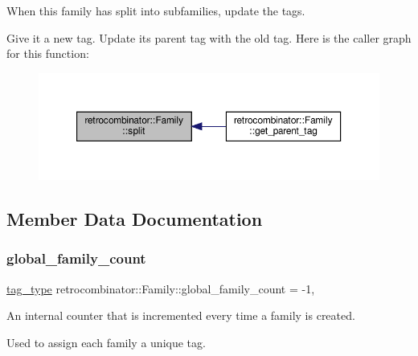 When this family has split into subfamilies, update the tags. 

Give it a new tag. Update its parent tag with the old tag. Here is the caller graph for this function\+:
\nopagebreak
\begin{figure}[H]
\begin{center}
\leavevmode
\includegraphics[width=350pt]{classretrocombinator_1_1Family_a721e453eb40fa49bd38ae24df001f9a3_icgraph}
\end{center}
\end{figure}


\subsection{Member Data Documentation}
\mbox{\label{classretrocombinator_1_1Family_a957b56c44378b30bfeb0a8eebe9aa32d}} 
\subsubsection{\texorpdfstring{global\+\_\+family\+\_\+count}{global\_family\_count}}
{\footnotesize\ttfamily \hyperlink{namespaceretrocombinator_afd7c6eb4293e8c4d12827609a9a34b9b}{tag\+\_\+type} retrocombinator\+::\+Family\+::global\+\_\+family\+\_\+count = -\/1\hspace{0.3cm}{\ttfamily [static]}, {\ttfamily [private]}}



An internal counter that is incremented every time a family is created. 

Used to assign each family a unique tag. \mbox{\label{classretrocombinator_1_1Family_aa5885cd6d63468db43859a860f7f16b4}} 
